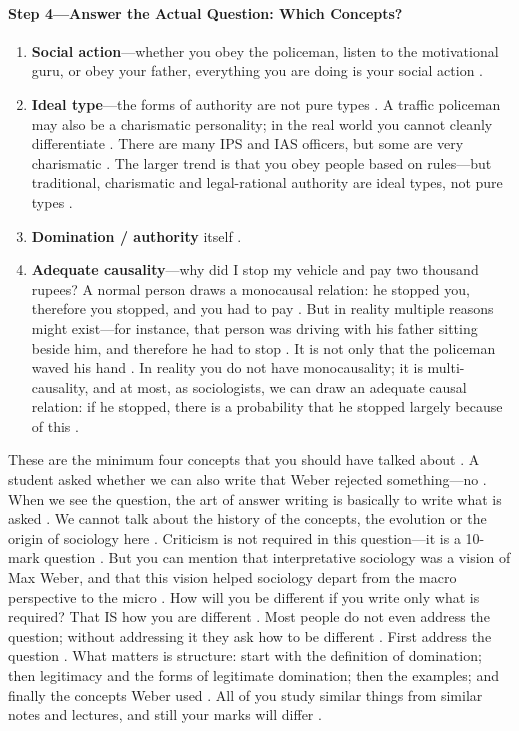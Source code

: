 \paragraph{Step 4---Answer the Actual Question: Which Concepts?}
\begin{enumerate}
    \item \textbf{Social action}---whether you obey the policeman, listen to the motivational guru, or obey your father, everything you are doing is your social action .
    \item \textbf{Ideal type}---the forms of authority are not pure types . A traffic policeman may also be a charismatic personality; in the real world you cannot cleanly differentiate . There are many IPS and IAS officers, but some are very charismatic . The larger trend is that you obey people based on rules---but traditional, charismatic and legal-rational authority are ideal types, not pure types .
    \item \textbf{Domination / authority} itself .
    \item \textbf{Adequate causality}---why did I stop my vehicle and pay two thousand rupees? A normal person draws a monocausal relation: he stopped you, therefore you stopped, and you had to pay . But in reality multiple reasons might exist---for instance, that person was driving with his father sitting beside him, and therefore he had to stop . It is not only that the policeman waved his hand . In reality you do not have monocausality; it is multi-causality, and at most, as sociologists, we can draw an adequate causal relation: if he stopped, there is a probability that he stopped largely because of this .
\end{enumerate}

\begin{PYQLink}
These are the minimum four concepts that you should have talked about .
A student asked whether we can also write that Weber rejected something---no . When we see the question, the art of answer writing is basically to write what is asked . We cannot talk about the history of the concepts, the evolution or the origin of sociology here .
Criticism is not required in this question---it is a 10-mark question . But you can mention that interpretative sociology was a vision of Max Weber, and that this vision helped sociology depart from the macro perspective to the micro .
How will you be different if you write only what is required? That IS how you are different . Most people do not even address the question; without addressing it they ask how to be different . First address the question .
What matters is structure: start with the definition of domination; then legitimacy and the forms of legitimate domination; then the examples; and finally the concepts Weber used . All of you study similar things from similar notes and lectures, and still your marks will differ .
\end{PYQLink}

